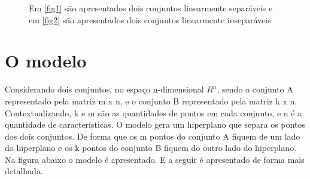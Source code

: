 \begin{figure}
\centering
{}
\qquad
{}
\label{img:linear_sepa}
\caption{Em \ref{fig1} são apresentados dois conjuntos linearmente separáveis e em \ref{fig2} são apresentados dois conjuntos linearmente inseparáveis}
\end{figure}

\section{O modelo}
Considerando dois conjuntos, no espaço n-dimensional $ R^{n} $, sendo o conjunto A representado pela matriz m x n, e o conjunto B representado pela matriz k x n. Contextualizando, k e m são as quantidades de pontos em cada conjunto, e n é a quantidade de características. O modelo gera um hiperplano que separa os pontos dos dois conjuntos. De forma que os m pontos do conjunto A fiquem de um lado do hiperplano e os k pontos do conjunto B fiquem do outro lado do hiperplano. Na figura abaixo o modelo é apresentado. E a seguir é apresentado de forma mais detalhada.


